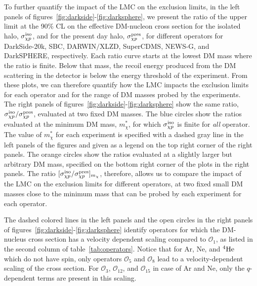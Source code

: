 \documentclass[a4paper,11pt]{article}
\begin{document}
 To further quantify the impact of the LMC on the exclusion limits, in the left panels of figures~\ref{fig:darkside}-\ref{fig:darksphere},  we present the ratio of 
 the upper limit at the 90\% CL on the effective DM-nucleon cross section for the isolated halo, $\sigma_{\chi p}^{\rm{iso}}$, and for the present day halo, $\sigma_{\chi p}^{\rm{pres}}$, for different operators for DarkSide-20k, SBC, DARWIN$\slash$XLZD, SuperCDMS, NEWS-G, and DarkSPHERE, respectively. Each ratio curve starts at the lowest DM mass where the ratio is finite. Below that mass, the recoil energy produced from the DM scattering in the detector is below the energy threshold of the experiment. From these plots, we can therefore quantify how the LMC impacts the exclusion limits for each operator and for the range of DM masses probed by the experiments. The right panels of figures~\ref{fig:darkside}-\ref{fig:darksphere} show the same ratio, $\sigma_{\chi p}^{\rm{iso}}/\sigma_{\chi p}^{\rm{pres}}$, evaluated at two fixed DM masses. The blue circles show the ratios evaluated at the minimum DM mass, $m_{\chi}^\ast$, for which $\sigma_{\chi p}^{\rm{iso}}$ is finite for \emph{all} operator. The value of ${m_\chi^\ast}$ for each experiment is specified with a dashed gray line in the left panels of the figures and given as a legend on the top right corner of the right panels. The orange circles show the ratios evaluated at a slightly larger but arbitrary DM mass, specified on the bottom right corner of the plots in the right panels. The ratio $[\sigma_{\chi p}^{\rm{iso}}/\sigma_{\chi p}^{\rm{pres}}]_{m_\chi}$, therefore, allows us to compare the impact of the LMC on the exclusion limits for different operators, at two fixed small DM masses close to the minimum mass that can be probed by each experiment for each operator.  
 

 The dashed colored lines in the left panels and the open circles in the right panels of figures~\ref{fig:darkside}-\ref{fig:darksphere} identify operators for which the DM-nucleus cross section has a velocity dependent scaling compared to $\mathcal{O}_1$, as listed in the second column of table~\ref{tab:operators}. Notice that for Ar, Ne, and $^{4}{\rm He}$ which do not have spin, only operators $\mathcal{O}_5$ and $\mathcal{O}_8$ lead to a velocity-dependent scaling of the cross section. For  $\mathcal{O}_3$, $\mathcal{O}_{12}$, and $\mathcal{O}_{15}$ in case of Ar and Ne, only the $q$-dependent terms are present in this scaling. 
 
\end{document}
